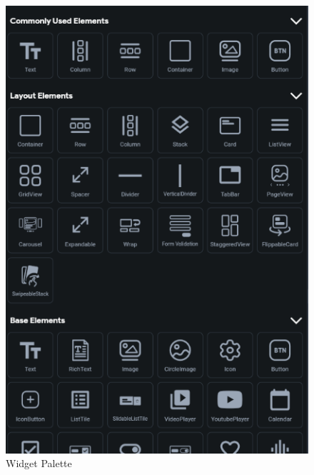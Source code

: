 \documentclass[acmtog, language=ngerman]{acmart}
\begin{document}
\begin{figure}[h]
    \centering
    \includegraphics[width=1\linewidth]{images/FF_widget_palette.png}
    \caption{Widget Palette}
    \label{fig:enter-label}
\end{figure}
\end{document}
